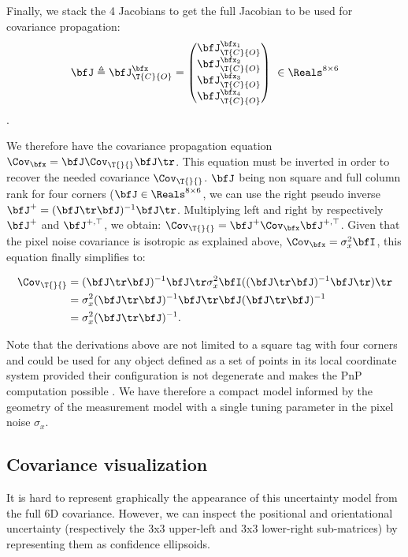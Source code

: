 Finally, we stack the 4 Jacobians to get the full Jacobian to be used for covariance propagation:
%
\begin{equation}
    \bfJ \triangleq \bfJ^{\bfx}_{\T{C}{O}}=
    \begin{pmatrix}
    \bfJ^{\bfx_1}_{\T{C}{O}} \\ 
    \bfJ^{\bfx_2}_{\T{C}{O}} \\ 
    \bfJ^{\bfx_3}_{\T{C}{O}} \\ 
    \bfJ^{\bfx_4}_{\T{C}{O}}
    \end{pmatrix}
    ~ \in \Reals^{8 \times 6}
\end{equation}.

We therefore have the covariance propagation equation $\Cov_{\bfx} = \bfJ \Cov_{\T{}{}} \bfJ\tr$. 
This equation must be inverted in order to recover the needed covariance $\Cov_{\T{}{}}$. $\bfJ$ being non square and full column rank for four 
corners ($\bfJ \in \Reals^{8 \times 6}$, we can use the right pseudo inverse $\bfJ^{+} = (\bfJ\tr \bfJ)^{-1}\bfJ\tr$. Multiplying left and right by 
respectively $\bfJ^{+}$ and $\bfJ^{+,\top}$, we obtain: $\Cov_{\T{}{}} = \bfJ^{+} \Cov_{\bfx} \bfJ^{+,\top}$. Given that the pixel noise covariance is 
isotropic as explained above, $\Cov_{\bfx} = \sigma_x^2 \bfI$, this equation finally simplifies to:

\begin{align}
    \Cov_{\T{}{}} 
    &=  (\bfJ\tr \bfJ)^{-1}\bfJ \tr \sigma_x^2 \bfI ((\bfJ\tr \bfJ)^{-1}\bfJ\tr)\tr \\
    &=  \sigma_x^2 (\bfJ\tr \bfJ)^{-1} \bfJ\tr \bfJ (\bfJ\tr \bfJ)^{-1} \\
    &= \sigma_{x}^2(\bfJ\tr \bfJ)^{-1}.
\end{align}

Note that the derivations above are not limited to a square tag with four corners and could be used for any object defined as
a set of points in its local coordinate system provided their configuration is not degenerate and makes the PnP computation possible \cite{gao2003complete}.  
We have therefore a compact model informed by the geometry of the measurement model with a single tuning parameter in the pixel noise $\sigma_x$.


\subsection{Covariance visualization}

It is hard to represent graphically the appearance of this uncertainty model from the full 6D covariance. However, we can inspect the positional and 
orientational uncertainty (respectively the 3x3 upper-left and 3x3 lower-right sub-matrices) by representing them as confidence ellipsoids.

